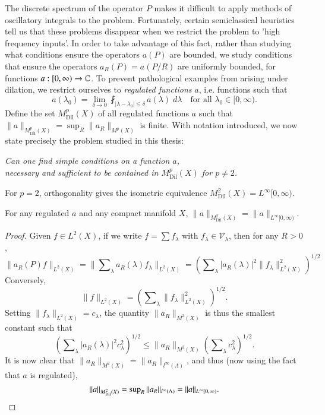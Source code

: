 The discrete spectrum of the operator $P$ makes it difficult to apply methods of oscillatory integrals to the problem. Fortunately, certain semiclassical heuristics tell us that these problems disappear when we restrict the problem to 'high frequency inputs'. In order to take advantage of this fact, rather than studying what conditions ensure the operators $a(P)$ are bounded, we study conditions that ensure the operators $a_R(P) = a(P/R)$ are uniformly bounded, for functions $a: [0,\infty) \to \operatorname{\mathbb{C}}$. %
To prevent pathological examples from arising under dilation, we restrict ourselves to \emph{regulated functions} $a$, i.e. functions such that
%
\[ a(\lambda_0) = \lim_{\delta \to 0} \fint_{|\lambda - \lambda_0| \leq \delta} a(\lambda)\; d\lambda \quad \text{for all $\lambda_0 \in [0,\infty)$}. \]
%
%
%
Define the set $M^p_{\text{Dil}}(X)$ of all regulated functions $a$ such that $\| a \|_{M^p_{\text{Dil}}(X)} = \sup_R \| a_R \|_{M^p(X)}$ is finite. With notation introduced, we now state precisely the problem studied in this thesis:
\begin{changemargin}{2cm}{2cm}
\begin{center}
  \emph{Can one find simple conditions on a function $a$,\\
  necessary and sufficient to be contained in $M^p_{\text{Dil}}(X)$ for $p \neq 2$.}
\end{center}
\end{changemargin}
%
For $p = 2$, orthogonality gives the isometric equivalence $M^2_{\text{Dil}}(X) = L^\infty[0,\infty)$.

\begin{lemma}
  For any regulated $a$ and any compact manifold $X$, $\| a \|_{M^2_{\text{Dil}}(X)} = \| a \|_{L^\infty[0,\infty)}$.
\end{lemma}
\begin{proof}
  Given $f \in L^2(X)$, if we write $f = \sum f_\lambda$ with $f_\lambda \in \mathcal{V}_\lambda$, then for any $R > 0$,
  \[ \| a_R(P) f \|_{L^2(X)} = \big\| \sum\nolimits_\lambda a_R(\lambda) f_\lambda \big\|_{L^2(X)} = \left( \sum\nolimits_\lambda |a_R(\lambda)|^2 \| f_\lambda \|_{L^2(X)}^2 \right)^{1/2} \]
  Conversely,
  \[ \| f \|_{L^2(X)} = \left( \sum\nolimits_\lambda \| f_\lambda \|_{L^2(X)}^2 \right)^{1/2}. \]
  Setting $\| f_\lambda \|_{L^2(X)} = c_\lambda$, the quantity $\| a_R \|_{M^2(X)}$ is thus the smallest constant such that
  \[ \left( \sum\nolimits_\lambda |a_R(\lambda)|^2 c_\lambda^2 \right)^{1/2} \leq \| a_R \|_{M^2(X)} \left( \sum\nolimits_\lambda c_\lambda^2 \right)^{1/2}. \]
  It is now clear that $\| a_R \|_{M^2(X)} = \| a_R \|_{l^\infty(\Lambda)}$, and thus (now using the fact that $a$ is regulated),
  \[ \| a \|_{M^2_{\text{Dil}}(X)} = \sup\nolimits_R \| a_R \|_{l^\infty(\Lambda)} = \| a \|_{L^\infty[0,\infty)} \qedhere. \]
\end{proof}

